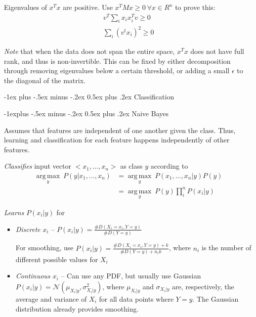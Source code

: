 \documentclass[10pt,landscape]{article}
\makeatletter
\renewcommand{\section}{\@startsection{section}{1}{0mm}%
                                {-1ex plus -.5ex minus -.2ex}%
                                {0.5ex plus .2ex}%
                                {\normalfont\large\bfseries}}
\renewcommand{\subsection}{\@startsection{subsection}{2}{0mm}%
                                {-1explus -.5ex minus -.2ex}%
                                {0.5ex plus .2ex}%
                                {\normalfont\normalsize\bfseries}}
\DeclareMathOperator*{\argmax}{arg\,max}
\makeatother
\begin{document}
\begin{multicols}{3}
Eigenvalues of $x^T x$ are positive. Use $x^T M x \geq 0 \:\forall x \in R^n$ to prove this:
\begin{align*}
v^T \sum_{i} x_i x_i^T v \geq 0\\
\sum_{i} (v^t x_i)^2 \geq 0
\end{align*}

\emph{Note} that when the data does not span the entire space, $x^T x$ does not have full rank, and thus is non-invertible. This can be fixed by either decomposition through removing eigenvalues below a certain threshold, or adding a small $\epsilon$ to the diagonal of the matrix.

\section{Classification}

\subsection{Naive Bayes}

Assumes that features are independent of one another given the class. Thus, learning and classification for each feature happens independently of other features.

\emph{Classifies} input vector $<x_1, ..., x_n>$ as class $y$ according to
\begin{align*}
	\underset{y}{\argmax} \ P(y | x_1, ..., x_n)
	&= \underset{y}{\argmax} \ P(x_1, ..., x_n | y) P(y)\\
	&= \underset{y}{\argmax} \ P(y) \prod_{i}^{n} P(x_i | y)
\end{align*}

\emph{Learns} $P(x_i | y)$ for
\begin{itemize}
	\item \emph{Discrete $x_i$} -- $P(x_i | y) = \frac{\#D(X_i = x_i, Y = y)}{\#D(Y = y)}$
	
	For smoothing, use $P(x_i | y) = \frac{\#D(X_i = x_i, Y = y) + k}{\#D(Y = y) + n_i k}$, where $n_i$ is the number of different possible values for $X_i$
	\item \emph{Continuous $x_i$} -- Can use any PDF, but usually use Gaussian $P(x_i | y) = \mathcal{N}(\mu_{X_i | y}, \sigma_{X_i | y}^2)$, where $\mu_{X_i | y}$ and $\sigma_{X_i | y}$ are, respectively, the average and variance of $X_i$ for all data points where $Y = y$. The Gaussian distribution already provides smoothing.
\end{itemize}


\end{multicols}
\end{document}
